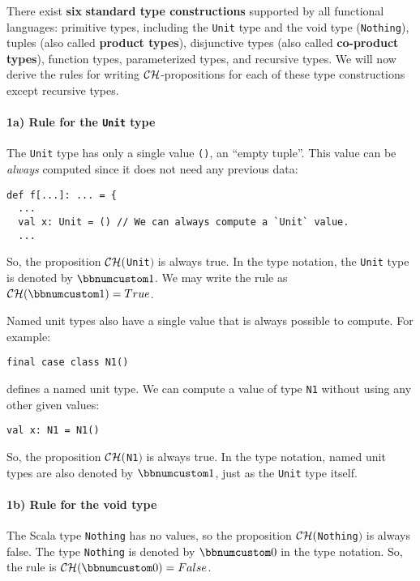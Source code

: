There exist \textbf{six} \textbf{standard type constructions}
supported by all functional languages: primitive types, including
the \lstinline!Unit! type and the void type (\lstinline!Nothing!),
tuples (also called \textbf{product types}),
disjunctive types (also called \textbf{co-product
types}), function types, parameterized types, and recursive types.
We will now derive the rules for writing ${\cal CH}$-propositions
for each of these type constructions except recursive types.

\paragraph{1a) Rule for the \texttt{Unit} type}

The \lstinline!Unit! type has only a single value \lstinline!()!,
an \textsf{``}empty tuple\textsf{''}. This value can be \emph{always} computed since
it does not need any previous data:
\begin{lstlisting}
def f[...]: ... = {
  ...
  val x: Unit = () // We can always compute a `Unit` value.
  ...
\end{lstlisting}
So, the proposition ${\cal CH}($\lstinline!Unit!$)$ is always true.
In the type notation, the \lstinline!Unit! type is denoted by $\bbnum 1$.
We may write the rule as $\mathcal{CH}(\bbnum 1)=True$. 

Named unit types also have a single value
that is always possible to compute. For example:
\begin{lstlisting}
final case class N1()
\end{lstlisting}
defines a named unit type. We can compute a value of type \lstinline!N1!
without using any other given values:
\begin{lstlisting}
val x: N1 = N1()
\end{lstlisting}
So, the proposition ${\cal CH}($\lstinline!N1!$)$ is always true.
In the type notation, named unit types are also denoted by $\bbnum 1$,
just as the \lstinline!Unit! type itself.

\paragraph{1b) Rule for the void type}

The Scala type \lstinline!Nothing! has no values, so the proposition
${\cal CH}($\lstinline!Nothing!$)$ is always false. The type \lstinline!Nothing!
is denoted by $\bbnum 0$ in the type notation. So, the rule is $\mathcal{CH}(\bbnum 0)=False$.

